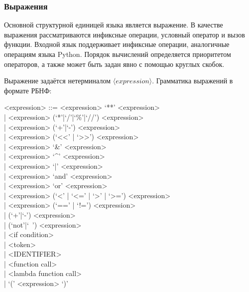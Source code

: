 \documentclass[12pt,a4paper,oneside]{extarticle}
\begin{document}
        \subsubsection{Выражения}
            Основной структурной единицей языка является выражение.
            В качестве выражения рассматриваются инфиксные операции, условный оператор и вызов функции.
            Входной язык поддерживает инфиксные операции, аналогичные операциям языка Python.
            Порядок вычислений определяется приоритетом операторов, а также может быть задан явно с помощью круглых скобок.

            Выражение задаётся нетерминалом $\langle expression \rangle$. Грамматика выражений в формате РБНФ:
            \begin{grammar}
                <expression> ::=
                      <expression> `**' <expression> \\
                    | <expression> (`*'|`/'|`\%'|`//') <expression> \\
                    | <expression> (`+'|`-') <expression> \\
                    | <expression> (`\textless\null\textless' | `\textgreater\null\textgreater') <expression> \\
                    | <expression> `&' <expression> \\
                    | <expression> `^' <expression> \\
                    | <expression> `|' <expression> \\
                    | <expression> `and' <expression> \\
                    | <expression> `or' <expression> \\
                    | <expression> (`\textless' | `\textless=' | `\textgreater' | `\textgreater=') <expression> \\
                    | <expression> (`==' | `!=') <expression> \\
                    | (`+'|`-') <expression> \\
                    | (`not'|`~') <expression> \\
                    | <if condition> \\
                    | <token> \\
                    | <IDENTIFIER> \\
                    | <function call> \\
                    | <lambda function call> \\
                    | `(' <expression> `)'
            \end{grammar}
\end{document}
